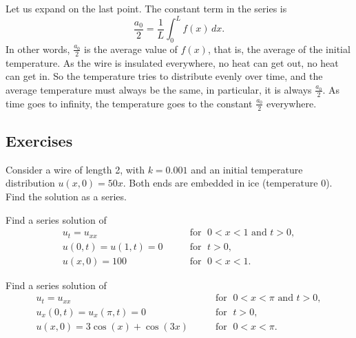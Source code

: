 Let us expand on the last point.  The constant term in the series is
\begin{equation*}
\frac{a_0}{2} = \frac{1}{L} \int_0^L f(x) \, dx .
\end{equation*}
In other words, $\frac{a_0}{2}$ is the average value of $f(x)$, that is,
the average of the initial temperature.  As the wire is insulated
everywhere, no heat can get out, no heat can get in.  So the temperature
tries to distribute evenly over time, and the average temperature must always be the
same, in particular, it is always $\frac{a_0}{2}$.  As time goes to
infinity, the temperature goes to the constant $\frac{a_0}{2}$ everywhere.

\subsection{Exercises}

\begin{exercise}
Consider a wire of length 2, with $k=0.001$ and an initial
temperature distribution $u(x,0) = 50 x$.  Both ends
are embedded in ice (temperature 0).  Find the solution as a series.
\end{exercise}

\begin{exercise}
Find a series solution of
\begin{equation*}
\begin{array}{ll}
u_t =  u_{xx} & \qquad \text{for } \; 0 < x < 1 \text{ and } t > 0, \\
u(0,t) = u(1,t) = 0 & \qquad \text{for } \; t > 0, \\
u(x,0) = 100 & \qquad \text{for } \; 0 < x < 1 .
\end{array}
\end{equation*}
\end{exercise}

\begin{exercise}
Find a series solution of
\begin{equation*}
\begin{array}{ll}
u_t =  u_{xx} & \qquad \text{for } \; 0 < x < \pi \text{ and } t > 0, \\
u_x(0,t) = u_x(\pi,t) = 0 & \qquad \text{for } \; t > 0, \\
u(x,0) = 3\cos (x) + \cos (3x) & \qquad \text{for } \; 0 < x < \pi .
\end{array}
\end{equation*}
\end{exercise}

